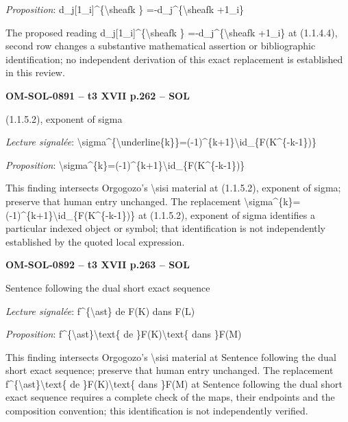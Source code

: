 \emph{Proposition}: d\_j[1\_i]\textasciicircum{}\{\textbackslash{}sheafk \} =\allowbreak  -d\_j\textasciicircum{}\{\textbackslash{}sheafk +1\_i\}\par
The proposed reading d\_j[1\_i]\textasciicircum{}\{\textbackslash{}sheafk \} =\allowbreak  -d\_j\textasciicircum{}\{\textbackslash{}sheafk +1\_i\} at (1.1.4.4), second row changes a substantive mathematical assertion or bibliographic identification; no independent derivation of this exact replacement is established in this review.\par
\par\noindent\textbf{OM-SOL-0891 -- t3 XVII p.262 -- SOL}\par
(1.1.5.2), exponent of sigma\par
\emph{Lecture signalée}: \textbackslash{}sigma\textasciicircum{}\{\textbackslash{}underline\{k\}\}=\allowbreak (-1)\textasciicircum{}\{k+1\}\textbackslash{}id\_\{F(K\textasciicircum{}\{-k-1\})\}\par
\emph{Proposition}: \textbackslash{}sigma\textasciicircum{}\{k\}=\allowbreak (-1)\textasciicircum{}\{k+1\}\textbackslash{}id\_\{F(K\textasciicircum{}\{-k-1\})\}\par
This finding intersects Orgogozo's \textbackslash{}sisi material at (1.1.5.2), exponent of sigma; preserve that human entry unchanged. The replacement \textbackslash{}sigma\textasciicircum{}\{k\}=\allowbreak (-1)\textasciicircum{}\{k+1\}\textbackslash{}id\_\{F(K\textasciicircum{}\{-k-1\})\} at (1.1.5.2), exponent of sigma identifies a particular indexed object or symbol; that identification is not independently established by the quoted local expression.\par
\par\noindent\textbf{OM-SOL-0892 -- t3 XVII p.263 -- SOL}\par
Sentence following the dual short exact sequence\par
\emph{Lecture signalée}: f\textasciicircum{}\{\textbackslash{}ast\} de F(K) dans F(L)\par
\emph{Proposition}: f\textasciicircum{}\{\textbackslash{}ast\}\textbackslash{}text\{ de \}F(K)\textbackslash{}text\{ dans \}F(M)\par
This finding intersects Orgogozo's \textbackslash{}sisi material at Sentence following the dual short exact sequence; preserve that human entry unchanged. The replacement f\textasciicircum{}\{\textbackslash{}ast\}\textbackslash{}text\{ de \}F(K)\textbackslash{}text\{ dans \}F(M) at Sentence following the dual short exact sequence requires a complete check of the maps, their endpoints and the composition convention; this identification is not independently verified.\par
